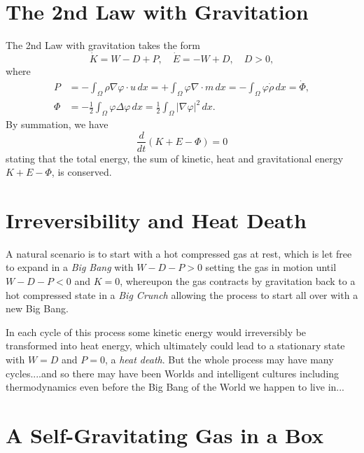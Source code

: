 
\section{The 2nd Law with Gravitation}

The 2nd Law with gravitation takes the form
\begin{equation}
\dot K=W-D+ P,\quad \dot E=-W+D,\quad D>0,
\end{equation}
where 
\[
\begin{split}
P&=-\int_\Omega \rho\nabla\varphi\cdot u\, dx =+\int_\Omega \varphi\nabla\cdot m\, dx=-\int_\Omega\varphi\dot\rho\, dx= \dot\Phi,\\
\Phi &=-\frac{1}{2}\int_\Omega \varphi\Delta\varphi\,dx =\frac{1}{2}\int_\Omega\vert\nabla\varphi\vert^2\, dx.
\end{split}
\] 
By summation, we have
\[
\frac{d}{dt}(K+E -\Phi)=0
\]
stating that the total energy, the sum of
kinetic, heat and gravitational energy $K+E -\Phi$, is conserved.

\section{Irreversibility and Heat Death}

A natural scenario is to start with a hot compressed gas at rest, which is
let free to expand in a \emph{Big Bang} with $W-D-P>0$ setting the
gas in motion until $W-D-P<0$ and $K=0$, whereupon the gas
contracts by gravitation back to a hot compressed state in a \emph{Big Crunch}
allowing the process to start all over with a new Big Bang.

In each cycle of this process some kinetic energy would irreversibly
be transformed into heat energy, which ultimately could lead to 
a stationary state with $W=D$ and $P=0$, a \emph{heat death}. But the 
whole process may have many cycles....and so there may have been Worlds
and intelligent cultures including thermodynamics  
even before the Big Bang of the World we happen to live in...   

\section{A Self-Gravitating Gas in a Box}

